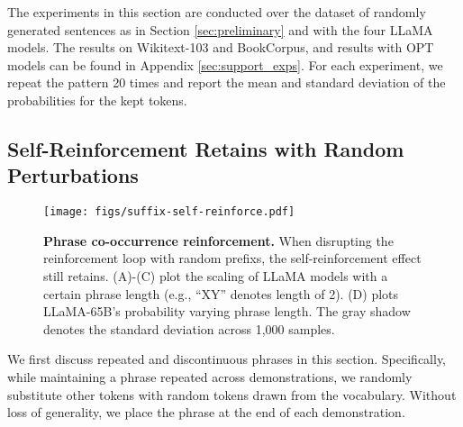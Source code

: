 \documentclass{article} %
\def\elliott#1{{\color{cyan}{\bf [Elliott:} {{#1}}{\bf ]}}}
\begin{document}
The experiments in this section are conducted over the dataset of randomly generated sentences as in Section \ref{sec:preliminary} and with the four LLaMA models. The results on Wikitext-103 and BookCorpus, and results with OPT models can be found in Appendix \ref{sec:support_exps}. For each experiment, we repeat the pattern 20 times and report the mean and standard deviation of the probabilities for the kept tokens. 


\subsection{Self-Reinforcement Retains with Random Perturbations}

\begin{figure}[t!]
  \centering
  \texttt{[image: figs/suffix-self-reinforce.pdf]}
\caption{\textbf{Phrase co-occurrence reinforcement.} When disrupting the reinforcement loop with random prefixs, the self-reinforcement effect still retains. (A)-(C) plot the scaling of LLaMA models with a certain phrase length (e.g., ``XY'' denotes length of 2). (D) plots LLaMA-65B's probability varying phrase length. The gray shadow denotes the standard deviation across 1,000 samples.}
\label{fig:suffix-reinforce}
\end{figure}


We first discuss repeated and discontinuous phrases in this section. 
Specifically, while maintaining a phrase repeated across demonstrations, we randomly substitute other tokens with random tokens drawn from the vocabulary. 
Without loss of generality, we place the phrase at the end of each demonstration. 
\end{document}
